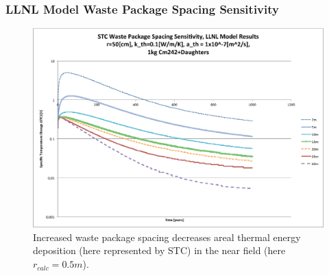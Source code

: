 

\begin{frame}[ctb!]
\frametitle{LLNL Model Waste Package Spacing Sensitivity}

\begin{figure}[htbp!]
\begin{center}
\includegraphics[height=0.7\textheight]{./thermal_demonstration/spacing/Cm242spacing_sens.eps}
\end{center}
\caption[$K_{th}$ Sensitivity to $s$]{Increased waste package 
spacing decreases areal thermal energy deposition 
(here represented by STC) in the near field (here $r_{calc} = 0.5m$).}
\label{fig:Cm242spacing_sens}
\end{figure}
\end{frame}



